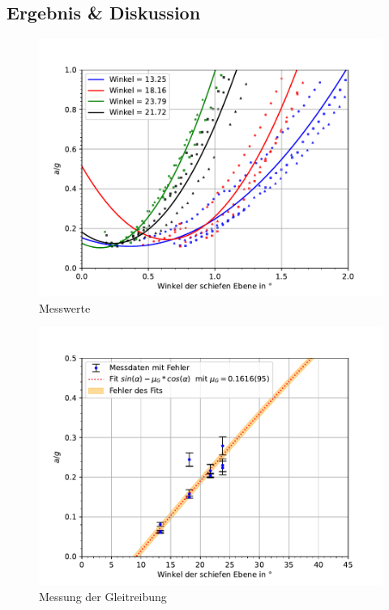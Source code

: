 \documentclass[11pt, a4paper]{article}
\begin{document}
    \subsection{Ergebnis \& Diskussion}
    \begin{figure}
        \centering
        \includegraphics[width=\textwidth]{./multiple.pdf}

        \caption{Messwerte}
        \label{fig:mult}
    \end{figure}
    \begin{figure}
        \centering
        \includegraphics[width=\textwidth]{./7Plotgleit.pdf}

        \caption{Messung der Gleitreibung}
        \label{fig:Gleitr}
    \end{figure}
\end{document}
